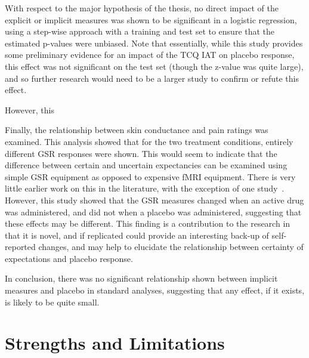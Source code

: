 With respect to the major hypothesis of the thesis, no direct impact
of the explicit or implicit measures was shown to be significant in a
logistic regression, using a step-wise approach with a training and
test set to ensure that the estimated p-values were unbiased. Note
that essentially, while this study provides some preliminary evidence
for an impact of the TCQ IAT on placebo response, this effect was not
significant on the test set (though the z-value was quite large), and
so further research would need to be a larger study to confirm or
refute this effect.

However, this %

Finally, the relationship between skin conductance and pain ratings
was examined. This analysis showed that for the two treatment
conditions, entirely different GSR responses were shown. This would
seem to indicate that the difference between certain and uncertain
expectancies can be examined using simple GSR equipment as opposed to
expensive fMRI equipment. There is very little earlier work on this in
the literature, with the exception of one study~\cite{Fujita2000}.
However, this study showed that the GSR measures changed when an
active drug was administered, and did not when a placebo was
administered, suggesting that these effects may be different. This
finding is a contribution to the research in that it is novel, and if
replicated could provide an interesting back-up of self-reported
changes, and may help to elucidate the relationship between certainty
of expectations and placebo response.

In conclusion, there was no significant relationship shown between
implicit measures and placebo in standard analyses, suggesting that
any effect, if it exists, is likely to be quite small.

\section{Strengths and Limitations}
\label{sec:strengths-limit}

